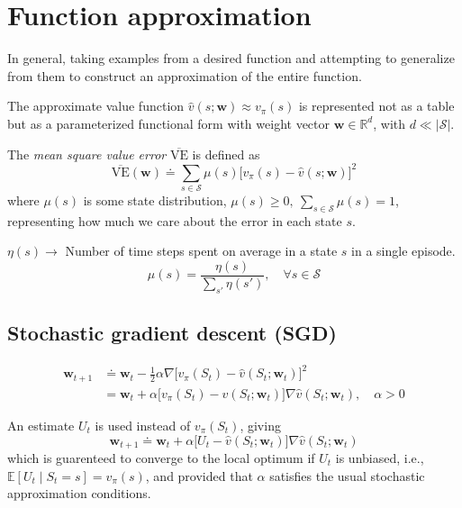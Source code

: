 \section{Function approximation}

In general, taking examples from a desired function and attempting to generalize from them to construct an approximation of the entire function.

The approximate value function \( \hat v(s; \mathbf{w}) \approx v_\pi(s) \) is represented not as a table but as a parameterized functional form with weight vector \( \mathbf{w} \in \mathbb{R}^d \), with \( d \ll \vert \mathcal{S} \vert \).

The \textit{mean square value error} \( \overline{\text{VE}} \) is defined as
\begin{equation}
    \overline{\text{VE}}(\mathbf{w}) \doteq \sum_{s \in \mathcal{S}} \mu(s) {\Big[ v_\pi(s) - \hat v(s; \mathbf{w}) \Big]}^2
\end{equation}
where \( \mu(s) \) is some state distribution, \( \mu(s) \geq 0, \ \sum_{s \in \mathcal{S}} \mu(s) = 1 \), representing how much we care about the error in each state \( s \).

\( \eta(s) \to \) Number of time steps spent on average in a state \( s \) in a single episode.
\begin{equation}
    \mu(s) = \frac{\eta(s)}{\sum_{s'} \eta(s')}
    , \quad \forall s \in \mathcal{S}
\end{equation}

\subsection{Stochastic gradient descent (SGD)}

\begin{equation}
    \begin{aligned}
        \mathbf{w}_{t+1}
         & \doteq
        \mathbf{w}_t - \frac{1}{2} \alpha \nabla {\Big[ v_\pi(S_t) - \hat v(S_t; \mathbf{w}_t) \Big]}^2
        \\ & =
        \mathbf{w}_t + \alpha \Big[ v_\pi(S_t) - \hat v(S_t; \mathbf{w}_t) \Big] \nabla \hat v(S_t; \mathbf{w}_t)
        , \quad \alpha > 0
    \end{aligned}
\end{equation}

An estimate \( U_t \) is used instead of \( v_\pi(S_t) \), giving
\begin{equation}
    \mathbf{w}_{t+1} \doteq \mathbf{w}_t + \alpha \Big[ U_t - \hat v(S_t; \mathbf{w}_t) \Big] \nabla \hat v(S_t; \mathbf{w}_t)
\end{equation}
which is guarenteed to converge to the local optimum if \( U_t \) is unbiased, i.e., \( \mathbb{E}[U_t \mid S_t = s] = v_\pi(s) \), and provided that \( \alpha \) satisfies the usual stochastic approximation conditions.

